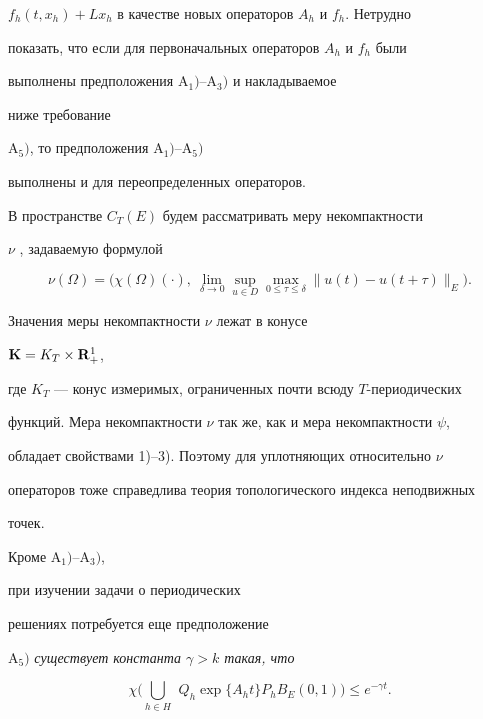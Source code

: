 $f_h(t, x_h)+Lx_h$ в качестве новых операторов $A_h$ и $f_h$. Нетрудно 


показать, что если для первоначальных операторов $A_h$ и $f_h$ были


выполнены предположения $\mathrm A_1)$--$\mathrm A_3)$ и накладываемое


ниже требование


$\mathrm A_5)$, то предположения $\mathrm A_1)$--$\mathrm A_5)$


выполнены и для переопределенных операторов. 





В пространстве $C_T (E)$ будем рассматривать меру некомпактности 


$\nu$ \cite{7}, задаваемую формулой


$$


\nu (\Omega) =\big(\chi (\Omega)(\cdot), \ \lim_{\delta \to 0}


\sup_{u\in D}\max_{0\le\tau\le\delta }\| u(t)-u(t+\tau)\|_E\big).


$$


Значения меры некомпактности $\nu$ лежат в конусе


$\bold K = K_T\times \bold R_+^1$, 


где $K_T$ --- конус измеримых, ограниченных почти всюду $T$-периодических


функций. Мера некомпактности $\nu$ так же, как и мера некомпактности $\psi$,


обладает свойствами 1)--3). Поэтому для уплотняющих относительно $\nu$ 


операторов тоже справедлива теория топологического индекса неподвижных


точек. 





Кроме $\mathrm A_1)$--$\mathrm A_3)$,


при изучении задачи о периодических 


решениях потребуется еще предположение


 


$\mathrm A_5)$ {\it существует константа $\gamma > k$ такая, что}


$$


\chi\Big(\bigcup\limits_{h\in H}\, \ Q_h \exp\{A_ht \} P_h B_E (0,1)


\Big)\le e^{-\gamma t}.


$$






